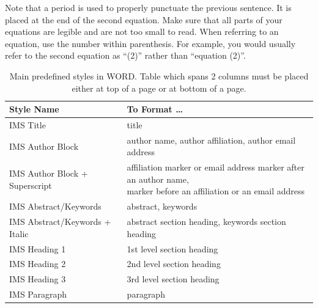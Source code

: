 \documentclass[conference,10pt,letterpaper]{IEEEtran}%
\begin{document}
Note that a period is used to properly punctuate the previous sentence.
It is placed at the end of the second equation. Make sure that all parts of
your equations are legible and are not too small to read. When referring to
an equation, use the number within parenthesis. For example, you would
usually refer to the second equation as ``(2)'' rather than ``equation (2)''. 

{%
\setlength{\tabcolsep}{1mm}%
\newcommand{\CPcolumnonewidth}{50mm}%
\newcommand{\CPcolumntwowidth}{91mm}%
\newcommand{\CPcell}[1]{\hspace{0mm}\rule[-0.3em]{0mm}{1.3em}#1}%
\newcommand{\CPcellbox}[1]{\parbox{90mm}{\hspace{0mm}\rule[-0.3em]{0mm}{1.3em}#1\strut}}%
\begin{table}
\caption{Main predefined styles in WORD.  Table which spans 2 columns must be placed either at top of a page or at bottom of a page.}
\small%
\centering
\begin{tabular}{|l|l|}\hline
\parbox{\CPcolumnonewidth}{\CPcell{\bfseries Style Name}} & \parbox{\CPcolumntwowidth}{\CPcell{\bfseries To Format \ldots}} \\ \hline
\CPcell{IMS Title} & \CPcell{title} \\ \hline
\CPcell{IMS Author Block} & \CPcell{author name, author affiliation, author email address} \\ \hline
\CPcell{IMS Author Block + Superscript} & \CPcellbox{affiliation marker or email address marker after an author name,\\ marker before an affiliation or an email address} \\ \hline
\CPcell{IMS Abstract/Keywords} & \CPcell{abstract, keywords} \\ \hline
\CPcell{IMS Abstract/Keywords + Italic} & \CPcell{abstract section heading, keywords section heading} \\ \hline
\CPcell{IMS Heading 1} & \CPcell{1st level section heading} \\ \hline
\CPcell{IMS Heading 2} & \CPcell{2nd level section heading} \\ \hline
\CPcell{IMS Heading 3} & \CPcell{3rd level section heading} \\ \hline
\CPcell{IMS Paragraph} & \CPcell{paragraph} \\ \hline

\end{tabular}
\end{table}}
\end{document}
